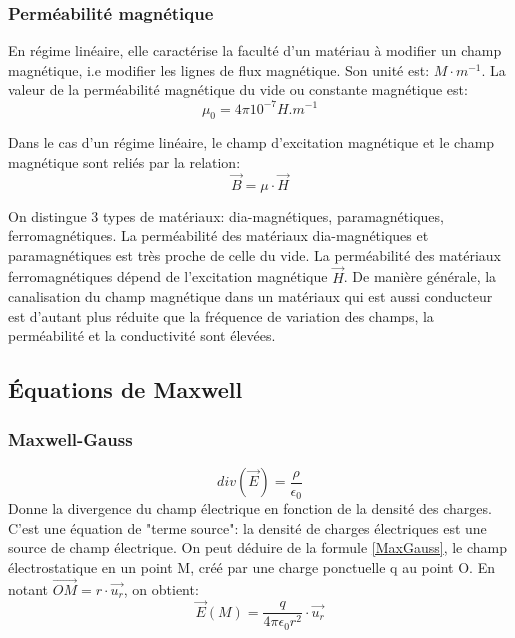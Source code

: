 \documentclass[10pt,a4paper]{article}
\begin{document}
\subsubsection{Perméabilité magnétique \cite{permmag}}
En régime linéaire, elle caractérise la faculté d'un matériau à modifier un champ magnétique, i.e modifier les lignes de flux magnétique. Son unité est: $M\cdot m^{-1}$.
La valeur de la perméabilité magnétique du vide ou constante  magnétique est:
\begin{equation}
\mu_{0} = 4\pi 10^{-7} H.m^{-1}
\end{equation}

 Dans le cas d'un régime linéaire, le champ d'excitation magnétique et le champ magnétique sont reliés par la relation:
\begin{equation}
\overrightarrow{B} = \mu\cdot \overrightarrow{H}
\end{equation}

On distingue 3 types de matériaux: dia-magnétiques, paramagnétiques, ferromagnétiques. La perméabilité des matériaux dia-magnétiques et paramagnétiques est très proche de celle du vide. La perméabilité des matériaux ferromagnétiques dépend de l'excitation magnétique $\overrightarrow{H}$. De manière générale, la canalisation du champ magnétique dans un matériaux qui est aussi conducteur est d'autant plus réduite que la fréquence de variation des champs, la perméabilité et la conductivité sont élevées.



\subsection{Équations de Maxwell}
\subsubsection{Maxwell-Gauss}
\begin{equation}
div(\overrightarrow{E}) = \frac{\rho}{\epsilon_{0}}
\label{MaxGauss}
\end{equation}
Donne la divergence du champ électrique en fonction de la densité des charges. C'est une équation de "terme source": la densité de charges électriques est une source de champ électrique.
On peut déduire de la formule \ref{MaxGauss}, le champ électrostatique en un point M, créé par une charge ponctuelle q au point O. En notant $\overrightarrow{OM} = r\cdot\overrightarrow{u_{r}}$, on obtient:
\begin{equation}
\overrightarrow{E}(M) = \frac{q}{4\pi\epsilon_{0}r^{2}}\cdot\overrightarrow{u_{r}}
\end{equation}
\end{document}
